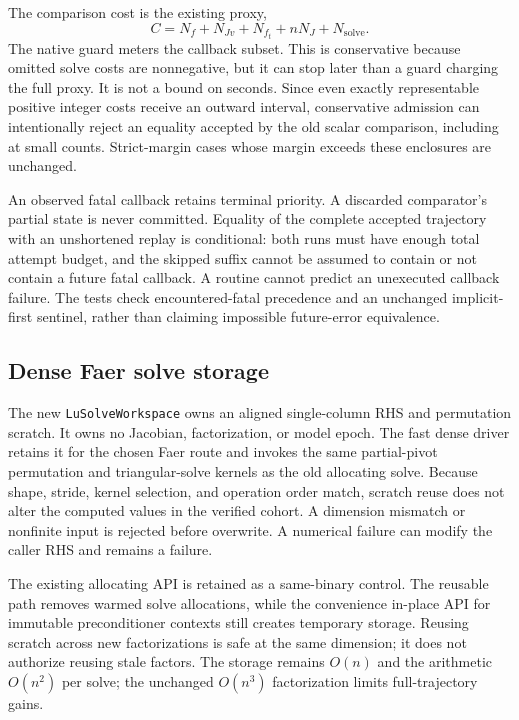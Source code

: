 \documentclass[aps,prd,reprint,amsmath,amssymb,longbibliography,nofootinbib]{revtex4-2}
\newcommand{\code}[1]{\texttt{#1}}
\begin{document}
The comparison cost is the existing proxy,
\begin{equation}
C=N_f+N_{Jv}+N_{f_t}+nN_J+N_{\mathrm{solve}}.
\end{equation}
The native guard meters the callback subset. This is conservative because omitted solve costs are nonnegative, but it can stop later than a guard charging the full proxy. It is not a bound on seconds. Since even exactly representable positive integer costs receive an outward interval, conservative admission can intentionally reject an equality accepted by the old scalar comparison, including at small counts. Strict-margin cases whose margin exceeds these enclosures are unchanged.

An observed fatal callback retains terminal priority. A discarded comparator's partial state is never committed. Equality of the complete accepted trajectory with an unshortened replay is conditional: both runs must have enough total attempt budget, and the skipped suffix cannot be assumed to contain or not contain a future fatal callback. A routine cannot predict an unexecuted callback failure. The tests check encountered-fatal precedence and an unchanged implicit-first sentinel, rather than claiming impossible future-error equivalence.

\subsection{Dense Faer solve storage}
The new \code{LuSolveWorkspace} owns an aligned single-column RHS and permutation scratch. It owns no Jacobian, factorization, or model epoch. The fast dense driver retains it for the chosen Faer route and invokes the same partial-pivot permutation and triangular-solve kernels as the old allocating solve. Because shape, stride, kernel selection, and operation order match, scratch reuse does not alter the computed values in the verified cohort. A dimension mismatch or nonfinite input is rejected before overwrite. A numerical failure can modify the caller RHS and remains a failure.

The existing allocating API is retained as a same-binary control. The reusable path removes warmed solve allocations, while the convenience in-place API for immutable preconditioner contexts still creates temporary storage. Reusing scratch across new factorizations is safe at the same dimension; it does not authorize reusing stale factors. The storage remains $O(n)$ and the arithmetic $O(n^2)$ per solve; the unchanged $O(n^3)$ factorization limits full-trajectory gains.
\end{document}
